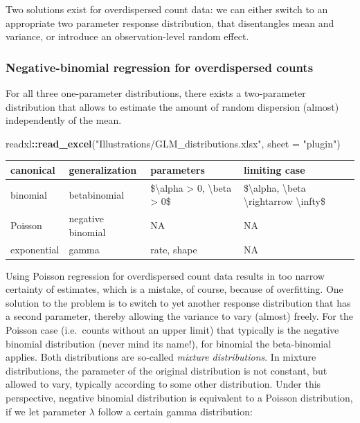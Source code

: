 \documentclass[]{svmono}
\newenvironment{Shaded}{\begin{snugshade}}{\end{snugshade}}
\newcommand{\KeywordTok}[1]{\textcolor[rgb]{0.13,0.29,0.53}{\textbf{#1}}}
\newcommand{\DataTypeTok}[1]{\textcolor[rgb]{0.13,0.29,0.53}{#1}}
\newcommand{\StringTok}[1]{\textcolor[rgb]{0.31,0.60,0.02}{#1}}
\newcommand{\OperatorTok}[1]{\textcolor[rgb]{0.81,0.36,0.00}{\textbf{#1}}}
\newcommand{\NormalTok}[1]{#1}
\begin{document}
Two solutions exist for overdispersed count data: we can either switch
to an appropriate two parameter response distribution, that disentangles
mean and variance, or introduce an observation-level random effect.

\subsubsection{Negative-binomial regression for overdispersed
counts}\label{negative-binomial-regression-for-overdispersed-counts}

For all three one-parameter distributions, there exists a two-parameter
distribution that allows to estimate the amount of random dispersion
(almost) independently of the mean.

\begin{Shaded}
\begin{Highlighting}[]
\NormalTok{readxl}\OperatorTok{::}\KeywordTok{read_excel}\NormalTok{(}\StringTok{"Illustrations/GLM_distributions.xlsx"}\NormalTok{, }\DataTypeTok{sheet =} \StringTok{"plugin"}\NormalTok{)}
\end{Highlighting}
\end{Shaded}

\begin{tabular}{l|l|l|l}
\hline
canonical & generalization & parameters & limiting case\\
\hline
binomial & betabinomial & \$\textbackslash{}alpha > 0, \textbackslash{}beta > 0\$ & \$\textbackslash{}alpha, \textbackslash{}beta \textbackslash{}rightarrow \textbackslash{}infty\$\\
\hline
Poisson & negative binomial & NA & NA\\
\hline
exponential & gamma & rate, shape & NA\\
\hline
\end{tabular}

Using Poisson regression for overdispersed count data results in too
narrow certainty of estimates, which is a mistake, of course, because of
overfitting. One solution to the problem is to switch to yet another
response distribution that has a second parameter, thereby allowing the
variance to vary (almost) freely. For the Poisson case (i.e.~counts
without an upper limit) that typically is the negative binomial
distribution (never mind its name!), for binomial the beta-binomial
applies. Both distributions are so-called \emph{mixture distributions}.
In mixture distributions, the parameter of the original distribution is
not constant, but allowed to vary, typically according to some other
distribution. Under this perspective, negative binomial distribution is
equivalent to a Poisson distribution, if we let parameter \(\lambda\)
follow a certain gamma distribution:
\end{document}

